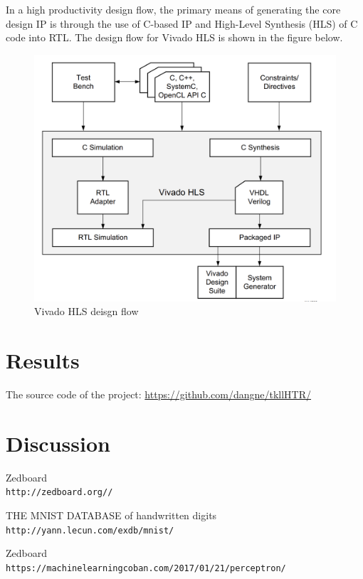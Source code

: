 \documentclass[12pt, a4paper, oneside]{article}
\begin{document}
    		In a high productivity design flow, the primary means of generating the core design IP is
    		through the use of C-based IP and High-Level Synthesis (HLS) of C code into RTL. The design flow for Vivado HLS is shown in the figure below. 
    		\begin{figure}[H]
    			\begin{center}
    				\includegraphics[scale=0.5]{HLS.png}
    				\caption{Vivado HLS deisgn flow}
    				\label{fig:Vivado HLS deisgn flow}
    			\end{center}
    		\end{figure}
    		
    \section{Results}
    	The source code of the project: \url{https://github.com/dangne/tkllHTR/}
    	
    \section{Discussion}
    
    
	\begin{thebibliography}{9}
    	Zedboard
   		\\\texttt{http://zedboard.org//}
    		
	   	THE MNIST DATABASE of handwritten digits
	   	\\\texttt{http://yann.lecun.com/exdb/mnist/}
	   	
	   	Zedboard
	   	\\\texttt{https://machinelearningcoban.com/2017/01/21/perceptron/}
   \end{thebibliography}
	    
\end{document}
